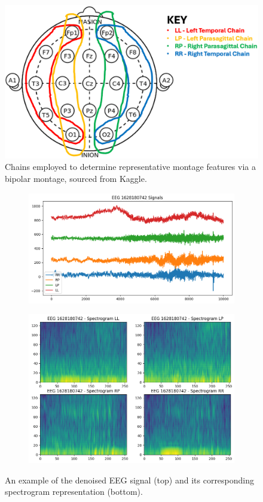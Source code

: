 \documentclass[conference]{IEEEtran}
\begin{document}
\begin{figure}[tbp]
\centering
\includegraphics[width=.45\textwidth]{inion}
\caption{Chains employed to determine representative montage features via
a bipolar montage, sourced from Kaggle.}
\label{fig:inion}
\end{figure}


\begin{figure}
\centering
\begin{subfigure}[b]{0.45\textwidth}
\includegraphics[width=\textwidth]{EEG_Signal}
\end{subfigure}
\hfill
\begin{subfigure}[b]{0.45\textwidth}
\includegraphics[width=\textwidth]{EEG_Spectrogram}
\end{subfigure}
\caption{An example of the denoised EEG signal (top) and its corresponding
	spectrogram representation (bottom).}
\label{fig:EEG}
\end{figure}
\end{document}
